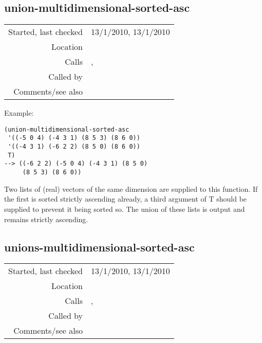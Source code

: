 \subsection*{union-multidimensional-sorted-asc}\label{fun:union-multidimensional-sorted-asc}

\vspace{0.3cm}
\begin{tabular}{r|p{8cm}}
Started, last checked & 13/1/2010, 13/1/2010 \\
Location & \nameref{sec:set-operations} \\
Calls & \nameref{fun:insert-retaining-sorted-asc}, \nameref{fun:sort-dataset-asc} \\
Called by & \nameref{fun:union-multidimensional-sorted-asc} \\
Comments/see also &
\end{tabular}

\vspace{0.5cm}
\noindent Example:
\begin{verbatim}
(union-multidimensional-sorted-asc
 '((-5 0 4) (-4 3 1) (8 5 3) (8 6 0))
 '((-4 3 1) (-6 2 2) (8 5 0) (8 6 0))
 T)
--> ((-6 2 2) (-5 0 4) (-4 3 1) (8 5 0)
     (8 5 3) (8 6 0))
\end{verbatim}

\noindent Two lists of (real) vectors of the same
dimension are supplied to this function. If the first
is sorted strictly ascending already, a third argument
of T should be supplied to prevent it being sorted so.
The union of these lists is output and remains
strictly ascending.


\subsection*{unions-multidimensional-sorted-asc}\label{fun:unions-multidimensional-sorted-asc}

\vspace{0.3cm}
\begin{tabular}{r|p{8cm}}
Started, last checked & 13/1/2010, 13/1/2010 \\
Location & \nameref{sec:set-operations} \\
Calls & \nameref{fun:sort-dataset-asc},\newline \nameref{fun:union-multidimensional-sorted-asc} \\
Called by & \\
Comments/see also &
\end{tabular}

